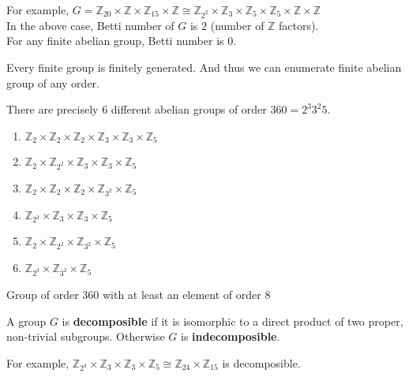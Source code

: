 For example, $ G = \mathbb{Z}_{20} \times \mathbb{Z} \times \mathbb{Z}_{15} \times \mathbb{Z} \cong \mathbb{Z}_{2^2} \times \mathbb{Z}_3 \times \mathbb{Z}_5 \times \mathbb{Z}_5 \times \mathbb{Z} \times \mathbb{Z}$ \\
In the above case, Betti number of $G$ is $2$ (number of $\mathbb{Z}$ factors).\\
For any finite abelian group, Betti number is $0$.

\begin{remark}
	Every finite group is finitely generated. And thus we can enumerate finite abelian group of any order.
\end{remark}

\begin{remark}
	There are precisely $6$ different abelian groups of order $360 = 2^3 3^2 5$.
	\begin{enumerate}
		\item $\mathbb{Z}_2 \times \mathbb{Z}_2 \times \mathbb{Z}_2 \times \mathbb{Z}_3 \times \mathbb{Z}_3 \times \mathbb{Z}_5$ 
		\item $\mathbb{Z}_2 \times \mathbb{Z}_{2^2} \times \mathbb{Z}_3 \times \mathbb{Z}_3 \times \mathbb{Z}_5$
		\item $\mathbb{Z}_2 \times \mathbb{Z}_2 \times \mathbb{Z}_2 \times \mathbb{Z}_{3^2} \times \mathbb{Z}_5$
		\item $\mathbb{Z}_{2^3} \times \mathbb{Z}_3 \times \mathbb{Z}_3 \times \mathbb{Z}_5$
		\item $\mathbb{Z}_2 \times \mathbb{Z}_{2^2} \times \mathbb{Z}_{3^2} \times \mathbb{Z}_5$
		\item $\mathbb{Z}_{2^3} \times \mathbb{Z}_{3^2} \times \mathbb{Z}_5$
	\end{enumerate}
\end{remark}

\begin{question}
	Group of order 360 with at least an element of order 8
\end{question}

\begin{definition}
	A group $G$ is \textbf{decomposible} if it is isomorphic to a direct product of two proper, non-trivial subgroups. Otherwise $G$ is \textbf{indecomposible}.
\end{definition}

	For example, $\mathbb{Z}_{2^3} \times \mathbb{Z}_3 \times \mathbb{Z}_3 \times \mathbb{Z}_5 \cong \mathbb{Z}_{24} \times \mathbb{Z}_{15}$ is decomposible.

